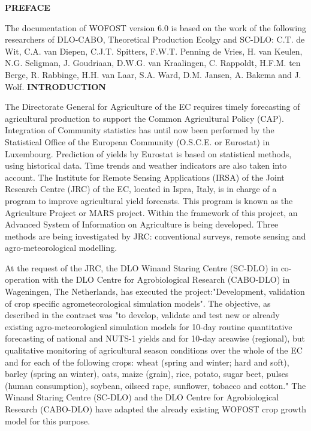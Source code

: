 \documentclass[11pt]{article}
\begin{document}
{\bf {\large PREFACE}}

The documentation of WOFOST version 6.0 is based on the work of the following
researchers of DLO-CABO, Theoretical Production Ecolgy and SC-DLO: C.T. de
Wit, C.A. van Diepen, C.J.T. Spitters, F.W.T. Penning de Vries, H. van Keulen, N.G.
Seligman, J. Goudriaan, D.W.G. van Kraalingen, C. Rappoldt, H.F.M. ten Berge, R.
Rabbinge, H.H. van Laar, S.A. Ward, D.M. Jansen, A. Bakema and J. Wolf.
\newpage
{\bf {\large INTRODUCTION}}

The Directorate General for Agriculture of the EC requires timely forecasting of
agricultural production to support the Common Agricultural Policy (CAP). Integra\-tion of Community statistics has until now been performed by the Statistical Office of
the European Community (O.S.C.E. or Eurostat) in Luxembourg. Prediction of yields
by Eurostat is based on statistical methods, using historical data. Time trends and
weather indicators are also taken into account. The Institute for Remote Sensing
Applications (IRSA) of the Joint Research Centre (JRC) of the EC, located in Ispra,
Italy, is in charge of a program to improve agricultural yield forecasts. This program
is known as the Agriculture Project or MARS project. Within the framework of this
project, an Advanced System of Information on Agriculture is being developed. Three
methods are being investigated by JRC: conventional surveys, remote sensing and
agro-meteorological modelling.

\bigskip
At the request of the JRC, the DLO Winand Staring Centre (SC-DLO) in co-operation with the DLO Centre for Agrobiological Research (CABO-DLO) in
Wageningen, The Nether\-lands, has executed the project:"Development, validation of
crop specific agrometeorological simulation models". The objective, as described in
the contract was "to develop, validate and test new or already existing agro-meteoro\-logical simulation models for 10-day routine quantitative forecasting of national and
NUTS-1 yields  and for 10-day areawise (regional), but qualitative monitoring of
agricultural season conditions over the whole of the EC and for each of the following
crops: wheat (spring and winter; hard and soft), barley (spring an winter), oats, maize
(grain), rice, potato, sugar beet, pulses (human consumption), soybean, oilseed rape,
sunflower, tobacco and cotton."  The Winand Staring Centre (SC-DLO) and the DLO
Centre for Agrobiological Research (CABO-DLO) have adapted the already existing
WOFOST crop growth model for this purpose.
\end{document}
